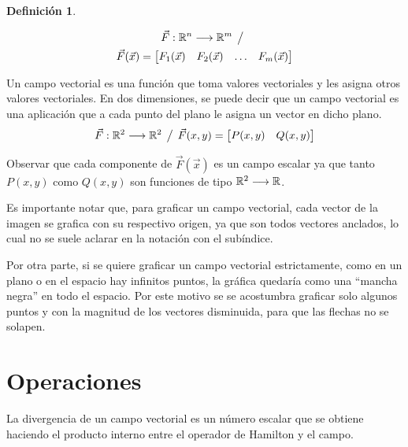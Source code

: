 \documentclass[a5paper,12pt,twoside]{book}
\newtheorem{defn}{{Definición}}[chapter]
\begin{document}
\begin{mdframed}[style=DefinitionFrame]
    \begin{defn}
    \end{defn}
    \begin{multline*}
        \Vec{F}:\mathbb{R}^n \longrightarrow \mathbb{R}^m \hspace{1ex} \big/ \hspace{1ex}
        \\
        \Vec{F}(\Vec{x}) = 
        \begin{bmatrix}
            F_1(\Vec{x}) & F_2(\Vec{x}) & \dots & F_m(\Vec{x})
        \end{bmatrix}
    \end{multline*}
\end{mdframed}

Un campo vectorial es una función que toma valores vectoriales y les asigna otros valores vectoriales.
En dos dimensiones, se puede decir que un campo vectorial es una aplicación que a cada punto del plano le asigna un vector en dicho plano.
\begin{equation*}
    \Vec{F}:\mathbb{R}^2 \longrightarrow \mathbb{R}^2 \hspace{1ex} \big/ \hspace{1ex} \Vec{F}(x,y)= 
    \begin{bmatrix}
        P(x,y) & Q(x,y)
    \end{bmatrix}
\end{equation*}

Observar que cada componente de $\Vec{F}(\Vec{x})$ es un campo escalar ya que tanto $P(x,y)$ como $Q(x,y)$ son funciones de tipo $\mathbb{R}^2 \longrightarrow \mathbb{R}$.

Es importante notar que, para graficar un campo vectorial, cada vector de la imagen se grafica con su respectivo origen, ya que son todos vectores anclados, lo cual no se suele aclarar en la notación con el subíndice.

Por otra parte, si se quiere graficar un campo vectorial estrictamente, como en un plano o en el espacio hay infinitos puntos, la gráfica quedaría como una ``mancha negra'' en todo el espacio.
Por este motivo se se acostumbra graficar solo algunos puntos y con la magnitud de los vectores disminuida, para que las flechas no se solapen.

\section{Operaciones}

La divergencia de un campo vectorial es un número escalar que se obtiene haciendo el producto interno entre el operador de 
Hamilton y el campo.
\end{document}
